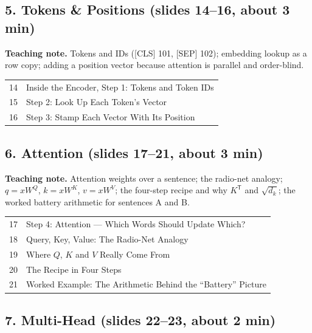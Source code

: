 \documentclass[11pt]{article}
\begin{document}
\subsection{5. Tokens \& Positions \normalfont\small\color{GreyN}(slides 14--16, about 3 min)}

\textbf{Teaching note.} Tokens and IDs ([CLS] 101, [SEP] 102); embedding lookup as a row copy; adding a position vector because attention is parallel and order-blind.

\begin{center}\small\renewcommand{\arraystretch}{1.1}\begin{tabularx}{\textwidth}{@{}r X@{}}14 & Inside the Encoder, Step 1: Tokens and Token IDs\\
15 & Step 2: Look Up Each Token's Vector\\
16 & Step 3: Stamp Each Vector With Its Position\\\end{tabularx}\end{center}

\subsection{6. Attention \normalfont\small\color{GreyN}(slides 17--21, about 3 min)}

\textbf{Teaching note.} Attention weights over a sentence; the radio-net analogy; $q=xW^Q$, $k=xW^K$, $v=xW^V$; the four-step recipe and why $K^{\mathsf T}$ and $\sqrt{d_k}$; the worked battery arithmetic for sentences A and B.

\begin{center}\small\renewcommand{\arraystretch}{1.1}\begin{tabularx}{\textwidth}{@{}r X@{}}17 & Step 4: Attention --- Which Words Should Update Which?\\
18 & Query, Key, Value: The Radio-Net Analogy\\
19 & Where $Q$, $K$ and $V$ Really Come From\\
20 & The Recipe in Four Steps\\
21 & Worked Example: The Arithmetic Behind the ``Battery'' Picture\\\end{tabularx}\end{center}

\subsection{7. Multi-Head \normalfont\small\color{GreyN}(slides 22--23, about 2 min)}
\end{document}
